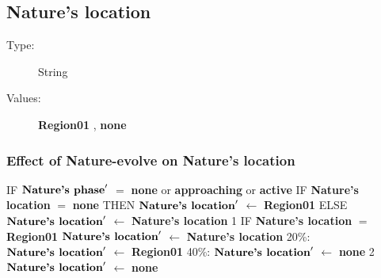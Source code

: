 \documentclass{article}%
\begin{document}
%
\subsection{Nature's location}%
\label{subsec:Nature's location}%
\begin{description}%
\item[Type:]%
String%
\item[Values:]%
\textbf{Region01}%
, %
\textbf{none}%
\end{description}%
\subsubsection{Effect of Nature{-}evolve on Nature's location}%
\label{ssubsec:Effect of Nature{-}evolve on Nature's location}%
\begin{flushleft}%
IF %
$\mbox{\textbf{Nature's phase}} '$%
$=$%
\textbf{none}%
 or %
\textbf{approaching}%
 or %
\textbf{active}%
\linebreak%
\hspace*{2em}%
IF %
\textbf{Nature's location}%
$=$%
\textbf{none}%
\linebreak%
\hspace*{4em}%
THEN %
$\mbox{\textbf{Nature's location}} '$%
$\leftarrow$%
\textbf{Region01}%
\linebreak%
\hspace*{4em}%
ELSE %
$\mbox{\textbf{Nature's location}} '$%
$\leftarrow$%
\textbf{Nature's location}%
\linebreak%
\hspace*{2em}%
1 %
IF %
\textbf{Nature's location}%
$=$%
\textbf{Region01}%
\linebreak%
\hspace*{4em}%
$\mbox{\textbf{Nature's location}} '$%
$\leftarrow$%
\textbf{Nature's location}%
\linebreak%
\hspace*{4em}%
\linebreak%
\hspace*{6em}%
20\%: %
$\mbox{\textbf{Nature's location}} '$%
$\leftarrow$%
\textbf{Region01}%
\linebreak%
\hspace*{6em}%
40\%: %
$\mbox{\textbf{Nature's location}} '$%
$\leftarrow$%
\textbf{none}%
\linebreak%
\hspace*{2em}%
2 %
$\mbox{\textbf{Nature's location}} '$%
$\leftarrow$%
\textbf{none}%
\end{flushleft}
\end{document}
